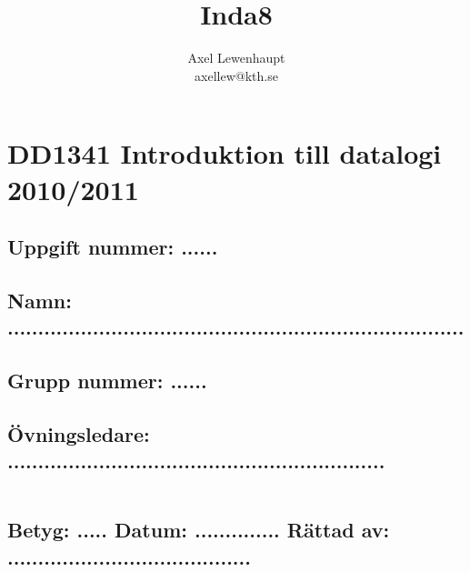 \documentclass[a4paper,11pt]{article}
\title{Inda8}
\author{Axel Lewenhaupt\\axellew@kth.se}
\begin{document}
\section*{}
\section*{DD1341 Introduktion till datalogi 2010/2011}

\vspace{10mm}

\subsection*{Uppgift nummer: ......}

\vspace{3mm}

\subsection*{Namn: ...........................................................................}

\vspace{3mm}

\subsection*{Grupp nummer: ......}

\vspace{3mm}

\subsection*{Övningsledare: ..............................................................}


\vspace{10mm}

\begin{tabular}{l}
 \hspace{140mm} \\
\hline \hline
\end{tabular}

\vspace{5mm}

\subsection*{Betyg: ..... \hspace{2mm}  Datum: .............. \hspace{2mm} Rättad av: ........................................}
\pagebreak
\tableofcontents
\pagebreak
\end{document}
